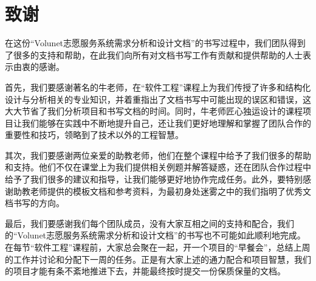 

\section*{致\qquad 谢}

\hspace{8mm}

在这份“Volunet志愿服务系统需求分析和设计文档”的书写过程中，我们团队得到了很多的支持和帮助，在此我们向所有对文档书写工作有贡献和提供帮助的人士表示由衷的感谢。

首先，我们要感谢著名的牛老师，在“软件工程”课程上为我们传授了许多和结构化设计与分析相关的专业知识，并着重指出了文档书写中可能出现的误区和错误，这大大节省了我们分析项目和书写文档的时间。同时，牛老师匠心独运设计的课程项目让我们能够在实践中不断地提升自己，还让我们更好地理解和掌握了团队合作的重要性和技巧，领略到了技术以外的工程智慧。

其次，我们要感谢两位亲爱的助教老师，他们在整个课程中给予了我们很多的帮助和支持。他们不仅在课堂上为我们提供相关例题并解答疑惑，还在团队合作过程中给予了我们很多的建议和指导，让我们能够更好地协作完成任务。此外，要特别感谢助教老师提供的模板文档和参考资料，为最初身处迷雾之中的我们指明了优秀文档书写的方向。

最后，我们要感谢我们每个团队成员，没有大家互相之间的支持和配合，我们的“Volunet志愿服务系统需求分析和设计文档”的书写也不可能如此顺利地完成。在每节“软件工程”课程前，大家总会聚在一起，开一个项目的“早餐会”，总结上周的工作并讨论和分配下一周的任务。正是有大家上述的通力配合和项目智慧，我们的项目才能有条不紊地推进下去，并能最终按时提交一份保质保量的文档。
